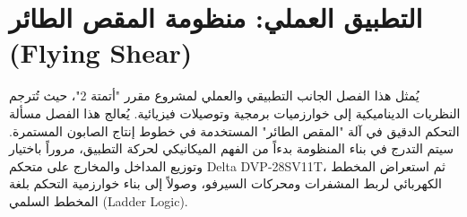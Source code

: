 \chapter{التطبيق العملي: منظومة المقص الطائر (\textenglish{Flying Shear})}
\label{ch:practical_application}

يُمثل هذا الفصل الجانب التطبيقي والعملي لمشروع مقرر "أتمتة 2"، حيث تُترجم النظريات الديناميكية إلى خوارزميات برمجية وتوصيلات فيزيائية. يُعالج هذا الفصل مسألة التحكم الدقيق في آلة "المقص الطائر" المستخدمة في خطوط إنتاج الصابون المستمرة. سيتم التدرج في بناء المنظومة بدءاً من الفهم الميكانيكي لحركة التطبيق، مروراً باختيار وتوزيع المداخل والمخارج على متحكم \textenglish{Delta DVP-28SV11T}، ثم استعراض المخطط الكهربائي لربط المشفرات ومحركات السيرفو، وصولاً إلى بناء خوارزمية التحكم بلغة المخطط السلمي (\textenglish{Ladder Logic}).

\vspace{0.5cm}





